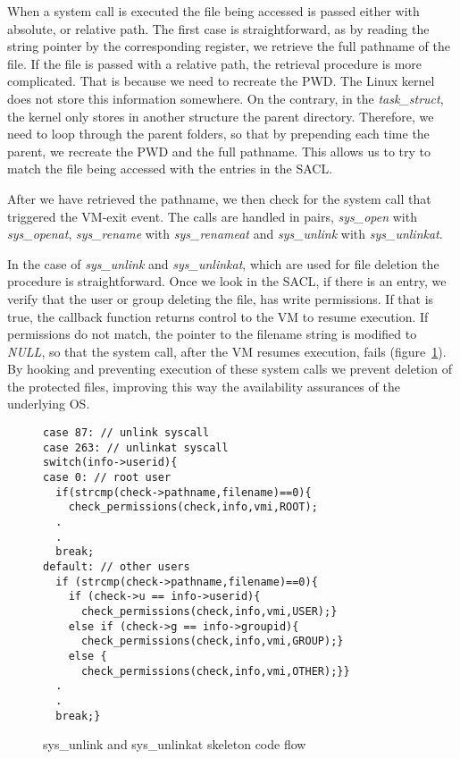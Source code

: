 \par When a system call is executed the file being accessed is passed either with absolute, or relative path. The first case is straightforward, as by reading the string pointer by the corresponding register, we retrieve the full pathname of the file. If the file is passed with a relative path, the retrieval procedure is more complicated. That is because we need to recreate the \ac{PWD}. The Linux kernel does not store this information somewhere. On the contrary, in the \textit{task\_struct}, the kernel only stores in another structure the parent directory. Therefore, we need to loop through the parent folders, so that by prepending each time the parent, we recreate the \ac{PWD} and the full pathname. This allows us to try to match the file being accessed with the entries in the \ac{SACL}.

\par After we have retrieved the pathname, we then check for the system call that triggered the VM-exit event. The calls are handled in pairs, \textit{sys\_open} with \textit{sys\_openat}, \textit{sys\_rename} with \textit{sys\_renameat} and \textit{sys\_unlink} with \textit{sys\_unlinkat}.

\par In the case of \textit{sys\_unlink} and \textit{sys\_unlinkat}, which are used for file deletion the procedure is straightforward. Once we look in the \ac{SACL}, if there is an entry, we verify that the user or group deleting the file, has write permissions. If that is true, the callback function returns control to the \ac{VM} to resume execution. If permissions do not match, the pointer to the filename string is modified to \textit{NULL}, so that the system call, after the \ac{VM} resumes execution, fails (figure~\ref{fig:unlink}). By hooking and preventing execution of these system calls we prevent deletion of the protected files, improving this way the availability assurances of the underlying \ac{OS}.

\begin{figure}[ht]
\centering
\begin{lstlisting}
case 87: // unlink syscall
case 263: // unlinkat syscall
switch(info->userid){
case 0: // root user
  if(strcmp(check->pathname,filename)==0){
	check_permissions(check,info,vmi,ROOT);			
  .
  .
  break;
default: // other users
  if (strcmp(check->pathname,filename)==0){
	if (check->u == info->userid){
	  check_permissions(check,info,vmi,USER);}
	else if (check->g == info->groupid){
	  check_permissions(check,info,vmi,GROUP);}
	else {
	  check_permissions(check,info,vmi,OTHER);}}
  .
  .
  break;}
\end{lstlisting}
\caption{sys\_unlink and sys\_unlinkat skeleton code flow}
\label{fig:unlink}
\end{figure}

